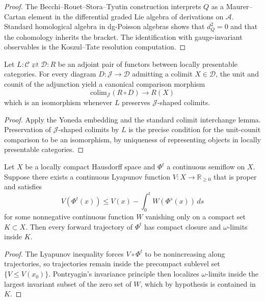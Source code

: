 \begin{proof}
The Becchi--Rouet--Stora--Tyutin construction interprets $Q$ as a Maurer--Cartan element in the differential graded Lie algebra of derivations on $\mathcal A$. Standard homological algebra in dg-Poisson algebras shows that $d_Q^2 = 0$ and that the cohomology inherits the bracket. The identification with gauge-invariant observables is the Koszul--Tate resolution computation.
\end{proof}

\begin{theorem}\label{thm-adjoint-surgery}
Let $L : \mathcal C \rightleftarrows \mathcal D : R$ be an adjoint pair of functors between locally presentable categories. For every diagram $D : \mathcal J \to \mathcal D$ admitting a colimit $X \in \mathcal D$, the unit and counit of the adjunction yield a canonical comparison morphism
\[
\mathrm{colim}_{\mathcal J} (R \circ D) \to R(X)
\]
which is an isomorphism whenever $L$ preserves $\mathcal J$-shaped colimits.
\end{theorem}

\begin{proof}
Apply the Yoneda embedding and the standard colimit interchange lemma. Preservation of $\mathcal J$-shaped colimits by $L$ is the precise condition for the unit-counit comparison to be an isomorphism, by uniqueness of representing objects in locally presentable categories.
\end{proof}

\begin{theorem}\label{thm-lyapunov-compactification}
Let $X$ be a locally compact Hausdorff space and $\Phi^t$ a continuous semiflow on $X$. Suppose there exists a continuous Lyapunov function $V : X \to \mathbb R_{\ge 0}$ that is proper and satisfies
\[
V(\Phi^t(x)) \le V(x) - \int_0^t W(\Phi^s(x))\, ds
\]
for some nonnegative continuous function $W$ vanishing only on a compact set $K \subset X$. Then every forward trajectory of $\Phi^t$ has compact closure and $\omega$-limits inside $K$.
\end{theorem}

\begin{proof}
The Lyapunov inequality forces $V \circ \Phi^t$ to be nonincreasing along trajectories, so trajectories remain inside the precompact sublevel set $\{V \le V(x_0)\}$. Pontryagin's invariance principle then localizes $\omega$-limits inside the largest invariant subset of the zero set of $W$, which by hypothesis is contained in $K$.
\end{proof}

